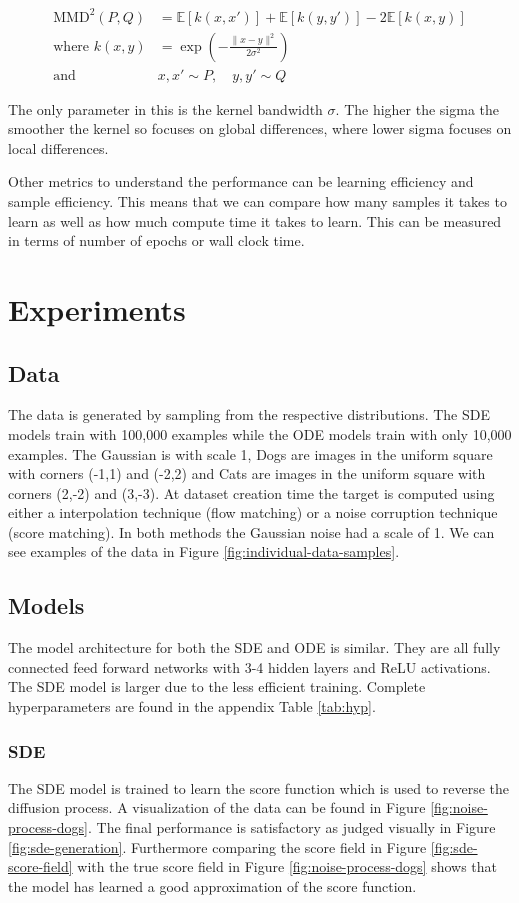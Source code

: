 \documentclass[conference,a4paper]{IEEEtran}
\begin{document}
\begin{align}
    \text{MMD}^2(P, Q) &= \mathbb{E}[k(x, x')] + \mathbb{E}[k(y, y')] - 2\mathbb{E}[k(x, y)]\\
    \text{where } k(x, y) &= \exp\left(-\frac{\|x - y\|^2}{2\sigma^2}\right)\\
    \text{and } &x, x' \sim P, \quad y, y' \sim Q 
\end{align}

The only parameter in this is the kernel bandwidth $\sigma$. The higher the sigma the smoother the kernel so focuses on global differences, where lower sigma focuses on local differences.

Other metrics to understand the performance can be learning efficiency and sample efficiency. This means that we can compare how many samples it takes to learn as well as how much compute time it takes to learn. This can be measured in terms of number of epochs or wall clock time.

\section{Experiments}

\subsection{Data}
The data is generated by sampling from the respective distributions. The SDE models train with 100,000 examples while the ODE models train with only 10,000 examples. The Gaussian is with scale 1, Dogs are images in the uniform square with corners (-1,1) and (-2,2) and Cats are images in the uniform square with corners (2,-2) and (3,-3). At dataset creation time the target is computed using either a interpolation technique (flow matching) or a noise corruption technique (score matching). In both methods the Gaussian noise had a scale of 1. We can see examples of the data in Figure \ref{fig:individual-data-samples}.

\subsection{Models}
The model architecture for both the SDE and ODE is similar. They are all fully connected feed forward networks with 3-4 hidden layers and ReLU activations. The SDE model is larger due to the less efficient training. Complete hyperparameters are found in the appendix Table \ref{tab:hyp}.

\subsubsection{SDE}
The SDE model is trained to learn the score function which is used to reverse the diffusion process. A visualization of the data can be found in Figure \ref{fig:noise-process-dogs}. The final performance is satisfactory as judged visually in Figure \ref{fig:sde-generation}. Furthermore comparing the score field in Figure \ref{fig:sde-score-field} with the true score field in Figure \ref{fig:noise-process-dogs} shows that the model has learned a good approximation of the score function.
\end{document}
